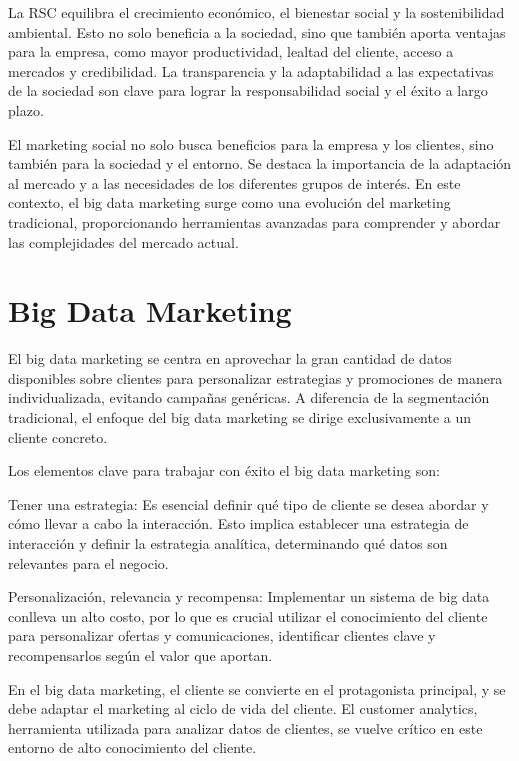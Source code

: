 \documentclass[
    a4paper, %
    10pt, %
    unnumberedsections, %
    twoside, %
]{LTJournalArticle}
\begin{document}
La RSC equilibra el crecimiento económico, el bienestar social y la sostenibilidad ambiental. Esto no solo beneficia a la sociedad, sino que también aporta ventajas para la empresa, como mayor productividad, lealtad del cliente, acceso a mercados y credibilidad. La transparencia y la adaptabilidad a las expectativas de la sociedad son clave para lograr la responsabilidad social y el éxito a largo plazo.

El marketing social no solo busca beneficios para la empresa y los clientes, sino también para la sociedad y el entorno. Se destaca la importancia de la adaptación al mercado y a las necesidades de los diferentes grupos de interés. En este contexto, el big data marketing surge como una evolución del marketing tradicional, proporcionando herramientas avanzadas para comprender y abordar las complejidades del mercado actual.



\section{Big Data Marketing}

El big data marketing se centra en aprovechar la gran cantidad de datos disponibles sobre clientes para personalizar estrategias y promociones de manera individualizada, evitando campañas genéricas. A diferencia de la segmentación tradicional, el enfoque del big data marketing se dirige exclusivamente a un cliente concreto.

Los elementos clave para trabajar con éxito el big data marketing son:

Tener una estrategia: Es esencial definir qué tipo de cliente se desea abordar y cómo llevar a cabo la interacción. Esto implica establecer una estrategia de interacción y definir la estrategia analítica, determinando qué datos son relevantes para el negocio.

Personalización, relevancia y recompensa: Implementar un sistema de big data conlleva un alto costo, por lo que es crucial utilizar el conocimiento del cliente para personalizar ofertas y comunicaciones, identificar clientes clave y recompensarlos según el valor que aportan.

En el big data marketing, el cliente se convierte en el protagonista principal, y se debe adaptar el marketing al ciclo de vida del cliente. El customer analytics, herramienta utilizada para analizar datos de clientes, se vuelve crítico en este entorno de alto conocimiento del cliente.
\end{document}

